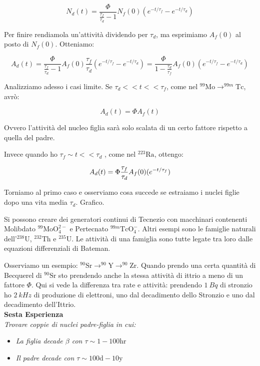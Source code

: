 \begin{equation}
N_d(t)=\frac{\Phi}{\frac{\tau_f}{\tau_d}-1}N_f(0)(e^{-t/\tau_f}-e^{-t/\tau_d})
\end{equation}

Per finire rendiamola un'attività dividendo per $\tau_d$, ma esprimiamo $A_f(0)$ al posto di $N_f(0)$. Otteniamo:

\begin{equation}
A_d(t)=\frac{\Phi}{\frac{\tau_f}{\tau_d}-1}A_f(0)\frac{\tau_f}{\tau_d}(e^{-t/\tau_f}-e^{-t/\tau_d}) =\frac{\Phi}{1-\frac{\tau_d}{\tau_f}}A_f(0)(e^{-t/\tau_f}-e^{-t/\tau_d})
\end{equation}

Analizziamo adesso i casi limite. Se $\tau_d << t << \tau_f$, come nel $^{99}\text{Mo} \rightarrow ^{99m}\text{Tc}$, avrò:

\begin{equation}
A_d(t)=\Phi A_f(t)
\end{equation}

Ovvero l'attività del nucleo figlia sarà solo scalata di un certo fattore rispetto a quella del padre.

Invece quando ho $\tau_f \sim t << \tau_d$ , come nel $^{223}\text{Ra}$, ottengo:

\begin{equation}
A_d(t)=\Phi \frac{\tau_f}{\tau_d}A_f(0)(\-e^{-t/\tau_f})
\end{equation}

Torniamo al primo caso e osserviamo cosa succede se estraiamo i nuclei figlie dopo una vita media $\tau_d$. Grafico.

Si possono creare dei generatori continui di Tecnezio con macchinari contenenti Molibdato $^{99}\text{MoO}_4^{2-}$ e Pertecnato $^{99m}\text{TcO}_4^-$.
Altri esempi sono le famiglie naturali dell'$^{238}\text{U}$, $^{232}\text{Th}$ e $^{235}\text{U}$.  Le attività di una famiglia sono tutte legate tra loro dalle equazioni differenziali di Bateman.

Osserviamo un esempio: $^{90}\text{Sr} \rightarrow ^{90}\text{Y} \rightarrow ^{90}\text{Zr}$. Quando prendo una certa quantità di Becquerel di $^{90}\text{Sr}$ sto prendendo anche la stessa attività di ittrio a meno di un fattore $\Phi$. Qui si vede la differenza tra rate e attività: prendendo $1 \ Bq$ di stronzio ho $2 \ kHz$ di produzione di elettroni, uno dal decadimento dello Stronzio e uno dal decadimento dell'Ittrio. \\

\textbf{Sesta Esperienza}\\

\emph{Trovare coppie di nuclei padre-figlia in cui:}
\begin{itemize}
\item \emph{La figlia decade $\beta$ con $\tau\sim1-100\text{hr}$}
\item \emph{Il padre decade con $\tau\sim100\text{d}-10\text{y}$}
\end{itemize}

